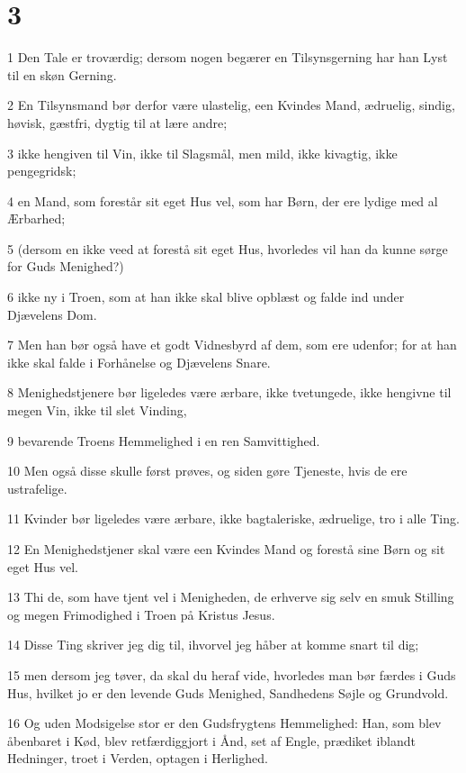 \chapter{3}

\par 1 Den Tale er troværdig; dersom nogen begærer en Tilsynsgerning har han Lyst til en skøn Gerning.
\par 2 En Tilsynsmand bør derfor være ulastelig, een Kvindes Mand, ædruelig, sindig, høvisk, gæstfri, dygtig til at lære andre;
\par 3 ikke hengiven til Vin, ikke til Slagsmål, men mild, ikke kivagtig, ikke pengegridsk;
\par 4 en Mand, som forestår sit eget Hus vel, som har Børn, der ere lydige med al Ærbarhed;
\par 5 (dersom en ikke veed at forestå sit eget Hus, hvorledes vil han da kunne sørge for Guds Menighed?)
\par 6 ikke ny i Troen, som at han ikke skal blive opblæst og falde ind under Djævelens Dom.
\par 7 Men han bør også have et godt Vidnesbyrd af dem, som ere udenfor; for at han ikke skal falde i Forhånelse og Djævelens Snare.
\par 8 Menighedstjenere bør ligeledes være ærbare, ikke tvetungede, ikke hengivne til megen Vin, ikke til slet Vinding,
\par 9 bevarende Troens Hemmelighed i en ren Samvittighed.
\par 10 Men også disse skulle først prøves, og siden gøre Tjeneste, hvis de ere ustrafelige.
\par 11 Kvinder bør ligeledes være ærbare, ikke bagtaleriske, ædruelige, tro i alle Ting.
\par 12 En Menighedstjener skal være een Kvindes Mand og forestå sine Børn og sit eget Hus vel.
\par 13 Thi de, som have tjent vel i Menigheden, de erhverve sig selv en smuk Stilling og megen Frimodighed i Troen på Kristus Jesus.
\par 14 Disse Ting skriver jeg dig til, ihvorvel jeg håber at komme snart til dig;
\par 15 men dersom jeg tøver, da skal du heraf vide, hvorledes man bør færdes i Guds Hus, hvilket jo er den levende Guds Menighed, Sandhedens Søjle og Grundvold.
\par 16 Og uden Modsigelse stor er den Gudsfrygtens Hemmelighed: Han, som blev åbenbaret i Kød, blev retfærdiggjort i Ånd, set af Engle, prædiket iblandt Hedninger, troet i Verden, optagen i Herlighed.

